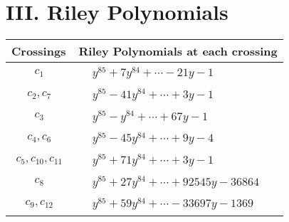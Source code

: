 \documentclass[1p]{elsarticle_modified}
\theoremstyle{definition}
\begin{document}
\centering \section*{ III. Riley Polynomials}
\begin{tabular}{m{50pt}|m{274pt}}
Crossings & \hspace{64pt}Riley Polynomials at each crossing \\
\hline $$\begin{aligned}c_{1}\end{aligned}$$&$\begin{aligned}
&y^{85}+7 y^{84}+\cdots-21 y-1
\end{aligned}$\\
\hline $$\begin{aligned}c_{2},c_{7}\end{aligned}$$&$\begin{aligned}
&y^{85}-41 y^{84}+\cdots+3 y-1
\end{aligned}$\\
\hline $$\begin{aligned}c_{3}\end{aligned}$$&$\begin{aligned}
&y^{85}- y^{84}+\cdots+67 y-1
\end{aligned}$\\
\hline $$\begin{aligned}c_{4},c_{6}\end{aligned}$$&$\begin{aligned}
&y^{85}-45 y^{84}+\cdots+9 y-4
\end{aligned}$\\
\hline $$\begin{aligned}c_{5},c_{10},c_{11}\end{aligned}$$&$\begin{aligned}
&y^{85}+71 y^{84}+\cdots+3 y-1
\end{aligned}$\\
\hline $$\begin{aligned}c_{8}\end{aligned}$$&$\begin{aligned}
&y^{85}+27 y^{84}+\cdots+92545 y-36864
\end{aligned}$\\
\hline $$\begin{aligned}c_{9},c_{12}\end{aligned}$$&$\begin{aligned}
&y^{85}+59 y^{84}+\cdots-33697 y-1369
\end{aligned}$\\
\hline
\end{tabular}
\vskip 2pc
\end{document}
